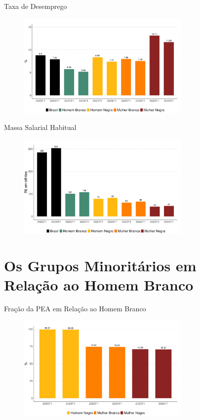 \documentclass[10pt, xcolor=x11names,compress]{beamer}
\begin{document}
	\begin{frame}{Taxa de Desemprego}
		\begin{figure}
			\centering
			\includegraphics[width = 0.75\textwidth]{figures_output/unemp.pdf}
		\end{figure}
	\end{frame}	
	
	\begin{frame}{Massa Salarial Habitual}
		\begin{figure}
			\centering
			\includegraphics[width = 0.75\textwidth]{figures_output/massa_habitual.pdf}
		\end{figure}
	\end{frame}
	
	
	\section{Os Grupos Minoritários em Relação ao Homem Branco} 
	\begin{frame}{Fração da PEA em Relação ao Homem Branco}
		\begin{figure}
			\centering
			\includegraphics[width = 0.75\textwidth]{figures_output/frac_pea.pdf}
		\end{figure}
	\end{frame}
	
\end{document}
